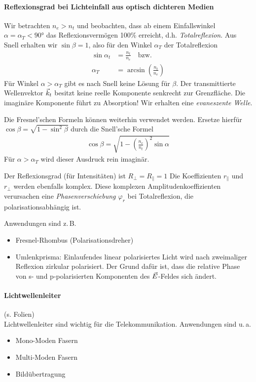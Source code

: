 \paragraph{Reflexionsgrad bei Lichteinfall aus optisch dichteren
  Medien}
Wir betrachten $n_e>n_t$ und beobachten, dass ab einem
Einfallswinkel $\alpha=\alpha_T<\ang{90}$ das Reflexionsvermögen
100\% erreicht, d.h. \emph{Totalreflexion}.
Aus Snell erhalten wir $\sin\beta = 1$, also für den Winkel
$\alpha_T$%
der Totalreflexion
\begin{align*}
  \sin\alpha_t &= \frac{n_t}{n_e} \quad\text{bzw.}\\
  \alpha_T &= \arcsin(\frac{n_t}{n_e})
\end{align*}
Für Winkel $\alpha>\alpha_T$ gibt es nach Snell keine Lösung
für $\beta$. Der transmittierte Wellenvektor $\vec{k}_t$ besitzt
keine reelle Komponente senkrecht zur Grenzfläche.
Die imaginäre Komponente führt zu Absorption! Wir erhalten eine
\emph{evaneszente Welle}.

Die Fresnel'schen Formeln können weiterhin verwendet
werden. Ersetze hierfür $\cos\beta = \sqrt{1-\sin^2\beta}$ durch
die Snell'sche Formel
\begin{gather*}
  \cos\beta = \sqrt{
    1 - \left(\frac{n_e}{n_t}\right)^2 \sin\alpha
  }
\end{gather*}
Für $\alpha>\alpha_T$ wird dieser Ausdruck rein imaginär.

Der Reflexionsgrad (für Intensitäten) ist $R_\bot=R_\parallel=1$
Die Koeffizienten $r_\parallel$ und $r_\bot$ werden ebenfalls komplex.
Diese komplexen Amplitudenkoeffizienten verursachen eine
\emph{Phasenverschiebung $\varphi_r$}
bei Totalreflexion, die polarisationsabhängig ist.

Anwendungen sind z.\,B.
\begin{itemize}
\item Fresnel-Rhombus (Polarisationsdreher)
\item Umlenkprisma: Einlaufendes linear polarisiertes Licht wird
  nach zweimaliger Reflexion zirkular polarisiert.
  Der Grund dafür ist, dass die relative Phase von s- und
  p-polarisierten Komponenten des $\vec{E}$-Feldes sich ändert.
\end{itemize}

\paragraph{Lichtwellenleiter}
(s. Folien)\\
Lichtwellenleiter sind wichtig für die Telekommunikation. 
Anwendungen sind u.\,a.
\begin{itemize}
\item Mono-Moden Fasern
\item Multi-Moden Fasern
\item Bildübertragung
\end{itemize}


